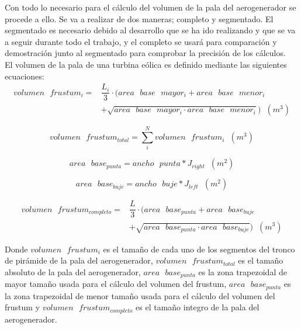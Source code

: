 Con todo lo necesario para el cálculo del volumen de la pala del aerogenerador se procede a ello. Se va a realizar de dos maneras; completo y segmentado. El segmentado es necesario debido al desarrollo que se ha ido realizando y que se va a seguir durante todo el trabajo, y el completo se usará para comparación y demostración junto al segmentado para comprobar la precisión de los cálculos.\\

El volumen de la pala de una turbina eólica es definido mediante las siguientes ecuaciones:
\begin{equation}
    \begin{split}
        volumen \text{ } frustum_i = & \dfrac{L_i}{3} \cdot (area \text{ } base \text{ } mayor_i + area \text{ } base \text{ } menor_i \\
        & + \sqrt{area \text{ } base \text{ } mayor_i \cdot area \text{ } base \text{ } menor_i}) \hspace{7pt} (m^3)
    \end{split}
\end{equation}

\begin{equation}
 volumen \text{ } frustum_{total} = \sum_{i}^{N}volumen \text{ } frustum_i \hspace{7pt} (m^3)
\end{equation}

\begin{equation}
 area \text{ } base_{punta} = ancho \text{ } punta * J_{right} \hspace{7pt} (m^2)
 \end{equation}

 \begin{equation}
 area \text{ } base_{buje} = ancho \text{ } buje * J_{left} \hspace{7pt} (m^2)
 \end{equation}
 
 \begin{equation}
    \begin{split}
        volumen \text{ } frustum_{completo} = & \dfrac{L}{3} \cdot ( area \text{ } base_{punta} + area \text{ }  base_{buje}\\
        & + \sqrt{area \text{ } base_{punta} \cdot area \text{ } base_{buje}}) \hspace{7pt} (m^3) 
    \end{split}
 \end{equation}

Donde $ volumen \text{ } frustum_i $ es el tamaño de cada uno de los segmentos del tronco de pirámide de la pala del aerogenerador, $ volumen \text{ } frustum_{total} $ es el tamaño absoluto de la pala del aerogenerador, $area \text{ } base_{punta}$ es la zona trapezoidal de mayor tamaño usada para el cálculo del volumen del frustum, $area \text{ } base_{punta}$ es la zona trapezoidal de menor tamaño usada para el cálculo del volumen del frustum y $ volumen \text{ } frustum_{completo} $ es el tamaño integro de la pala del aerogenerador.\\


